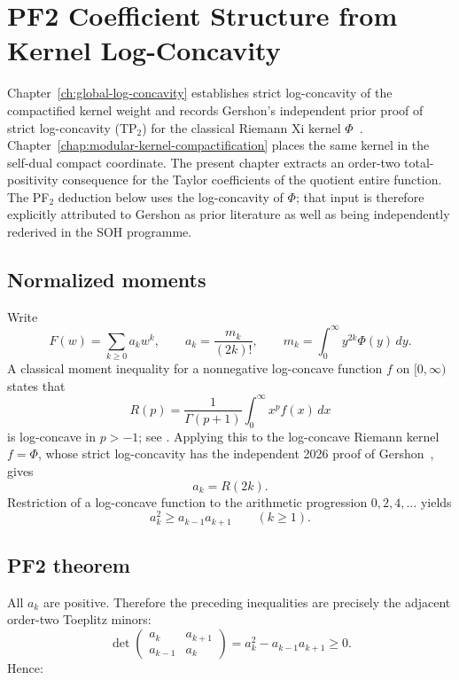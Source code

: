 \chapter{PF2 Coefficient Structure from Kernel Log-Concavity}
\label{chap:pf2-coefficient-structure}


Chapter~\ref{ch:global-log-concavity} establishes strict log-concavity of the compactified kernel weight and records Gershon's independent prior proof of strict log-concavity (TP$_2$) for the classical Riemann Xi kernel $\Phi$~\cite{gershon2026logconcavity}. Chapter~\ref{chap:modular-kernel-compactification} places the same kernel in the self-dual compact coordinate. The present chapter extracts an order-two total-positivity consequence for the Taylor coefficients of the quotient entire function. The PF$_2$ deduction below uses the log-concavity of $\Phi$; that input is therefore explicitly attributed to Gershon as prior literature as well as being independently rederived in the SOH programme.

\section{Normalized moments}

Write
\[
F(w)=\sum_{k\ge0}a_kw^k,
\qquad
 a_k=\frac{m_k}{(2k)!},
\qquad
 m_k=\int_0^\infty y^{2k}\Phi(y)\,dy.
\]
A classical moment inequality for a nonnegative log-concave function $f$ on $[0,\infty)$ states that
\[
R(p)=\frac{1}{\Gamma(p+1)}\int_0^\infty x^p f(x)\,dx
\]
is log-concave in $p>-1$; see \citet{karlinproschanbarlow1961}. Applying this to the log-concave Riemann kernel $f=\Phi$, whose strict log-concavity has the independent 2026 proof of Gershon~\cite{gershon2026logconcavity}, gives
\[
a_k=R(2k).
\]
Restriction of a log-concave function to the arithmetic progression $0,2,4,\ldots$ yields
\[
\boxed{a_k^2\ge a_{k-1}a_{k+1}\qquad(k\ge1).}
\]

\section{PF2 theorem}

All $a_k$ are positive. Therefore the preceding inequalities are precisely the adjacent order-two Toeplitz minors:
\[
\det\begin{pmatrix}
a_k&a_{k+1}\\
a_{k-1}&a_k
\end{pmatrix}
=a_k^2-a_{k-1}a_{k+1}\ge0.
\]
Hence:

